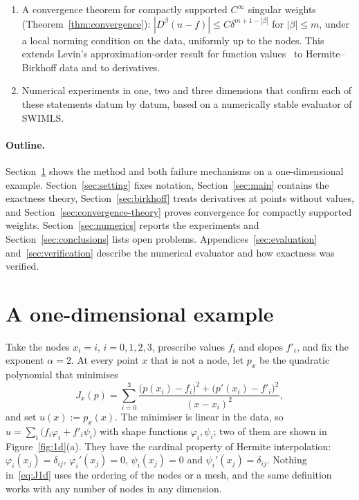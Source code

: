 \documentclass[12pt]{amsart}
\theoremstyle{definition}
\theoremstyle{remark}
\begin{document}
\begin{enumerate}[label=(\arabic*)]
  \item A convergence theorem for compactly supported $C^\infty$ singular weights
        (Theorem~\ref{thm:convergence}): $|D^\beta(u-f)|\le C\delta^{m+1-|\beta|}$ for
        $|\beta|\le m$, under a local norming condition on the data, uniformly up to the nodes.
        This extends Levin's approximation-order result for function values~\cite{Levin1998} to
        Hermite--Birkhoff data and to derivatives.
  \item Numerical experiments in one, two and three dimensions that confirm each of these
        statements datum by datum, based on a numerically stable evaluator of SWIMLS.
\end{enumerate}

\paragraph{Outline.} Section~\ref{sec:example} shows the method and both failure mechanisms on
a one-dimensional example. Section~\ref{sec:setting} fixes notation, Section~\ref{sec:main}
contains the exactness theory,
Section~\ref{sec:birkhoff} treats derivatives at points without values, and
Section~\ref{sec:convergence-theory} proves convergence for compactly supported weights.
Section~\ref{sec:numerics} reports the experiments and Section~\ref{sec:conclusions} lists open
problems. Appendices~\ref{sec:evaluation} and~\ref{sec:verification} describe the numerical
evaluator and how exactness was verified.

\section{A one-dimensional example}\label{sec:example}
Take the nodes $x_i=i$, $i=0,1,2,3$, prescribe values $f_i$ and slopes $f'_i$, and fix the
exponent $\alpha=2$. At every point $x$ that is not a node, let $p_x$ be the quadratic
polynomial that minimises
\begin{equation}\label{eq:J1d}
  J_x(p)=\sum_{i=0}^{3}\frac{\bigl(p(x_i)-f_i\bigr)^2+\bigl(p'(x_i)-f'_i\bigr)^2}{(x-x_i)^2},
\end{equation}
and set $u(x):=p_x(x)$. The minimiser is linear in the data, so
$u=\sum_i\bigl(f_i\varphi_i+f'_i\psi_i\bigr)$ with shape functions $\varphi_i,\psi_i$; two of
them are shown in Figure~\ref{fig:1d}(a). They have the cardinal property of Hermite
interpolation: $\varphi_i(x_j)=\delta_{ij}$, $\varphi_i'(x_j)=0$, $\psi_i(x_j)=0$ and
$\psi_i'(x_j)=\delta_{ij}$. Nothing in~\eqref{eq:J1d} uses the ordering of the nodes or a mesh,
and the same definition works with any number of nodes in any dimension.
\end{document}
